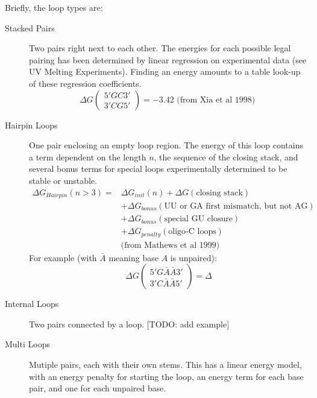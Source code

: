 Briefly, the loop types are:
\begin{description}
\item[Stacked Pairs] Two pairs right next to each other. The energies
  for each possible legal pairing has been determined by linear
  regression on experimental data (see UV Melting
  Experiments). Finding an energy amounts to a table look-up of these
  regression coefficients.
\begin{equation}
  \Delta G \left ( \begin{array}{c} 5' G C 3'  \\ 3' C G 5' \end{array} \right ) = -3.42\text{ (from Xia et al 1998) } 
\end{equation}
\item[Hairpin Loops] One pair enclosing an empty loop region. The
  energy of this loop contains a term dependent on the length $n$, the
  sequence of the closing stack, and several bonus terms for special
  loops experimentally determined to be stable or unstable.
  \begin{equation}
    \begin{split}
      \Delta G_{Hairpin} (n > 3) =& \Delta G_{init}(n) + \Delta G(\text{closing stack})\\
      &+ \Delta G_{bonus} (\text{UU or GA first mismatch, but not AG} ) \\
      &+ \Delta G_{bonus} (\text{special GU closure} ) \\
      &+ \Delta G_{penalty} (\text{oligo-C loops}) \\
      & \text{(from Mathews et al 1999) }
    \end{split}
  \end{equation}
  For example (with $\bar{A}$ meaning base $A$ is unpaired):
  \begin{equation}
    \Delta G \left ( \begin{array}{c} 5' G \bar{A} \bar{A} 3' \\ 3' C \bar{A} \bar{A} 5' \end{array} \right )
    = \Delta
  \end{equation}


\item[Internal Loops] Two pairs connected by a loop.
  [TODO: add example]
\item[Multi Loops] Mutiple pairs, each with their own stems. This has
  a linear energy model, with an energy penalty for starting the loop,
  an energy term for each base pair, and one for each unpaired base.

\end{description}

